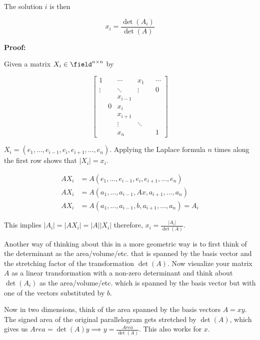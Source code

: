 The solution \(i\) is then

\[
    x_i = \frac{\det(A_i)}{\det(A)}
\]

\textbf{Proof:}

Given a matrix \(X_i \in \field^{n \times n}\) by

\[
    \begin{bmatrix}
        1      &   & \cdots    & x_1    &  & \cdots \\
        \vdots &   & \ddots    & \vdots &  & 0      \\
               &   & x_{i - 1} &        &  &        \\
               & 0 & x_i       &        &  &        \\
               &   & x_{i + 1} &        &  &        \\
               &   & \vdots    & \ddots &  &        \\
               &   & x_n       &        &  & 1
    \end{bmatrix}
\]

\(X_i = (e_1, \dots, e_{i - 1}, e_i, e_{i + 1}, \dots, e_n)\). Applying the Laplace formula \(n\) times along the first row shows that \(|X_i| = x_i\).

\begin{align*}
    A X_i & = A (e_1, \dots, e_{i - 1}, e_i, e_{i + 1}, \dots, e_n)     \\
    A X_i & = A (a_1, \dots, a_{i - 1}, Ax, a_{i + 1}, \dots, a_n)      \\
    A X_i & = A (a_1, \dots, a_{i - 1}, b, a_{i + 1}, \dots, a_n) = A_i
\end{align*}

This implies \(|A_i| = |AX_i| = |A||X_i|\) therefore, \(x_i = \frac{|A_i|}{\det(A)}\).

\QED

Another way of thinking about this in a more geometric way is to first think of the determinant as the area/volume/etc. that is spanned by the basis 
vector and the stretching factor of the transformation \(\det(A)\). Now visualize your matrix \(A\) as a linear transformation with
a non-zero determinant and think about \(\det(A_i)\) as the area/volume/etc. which is spanned by the basis vector but with one of the vectors substituted 
by \(b\).

Now in two dimensions, think of the area spanned by the basis vectors \(A = xy\). The signed area of the original parallelogram gets
stretched by \(\det(A)\), which gives us \(Area = \det(A)y \implies y = \frac{Area}{\det(A)}\). This also works for \(x\).

